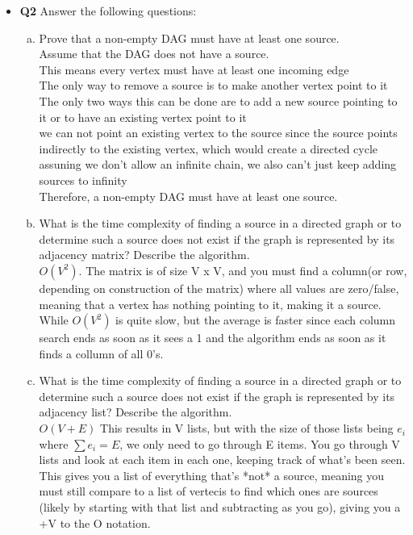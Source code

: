 \documentclass[11pt]{article}
\begin{document}
\begin{itemize}
\item \textbf{Q2} 
Answer the following questions:
\begin{enumerate}[(a)]
\item Prove that a non-empty DAG must have at least one source.
\\Assume that the DAG does not have a source.
\\This means every vertex must have at least one incoming edge
\\The only way to remove a source is to make another vertex point to it
\\The only two ways this can be done are to add a new source pointing to it or to have an existing vertex point to it
\\we can not point an existing vertex to the source since the source points indirectly to the existing vertex, which would create a directed cycle
\\assuning we don't allow an infinite chain, we also can't just keep adding sources to infinity
\\Therefore, a non-empty DAG must have at least one source.
\item What is the time complexity of finding a source in a directed graph or to determine such a source does not exist if the graph is represented by its adjacency matrix? Describe the algorithm.
\\$O(V^2)$. The matrix is of size V x V, and you must find a column(or row, depending on construction of the matrix) where all values are zero/false, meaning that a vertex has nothing pointing to it, making it a source. While $O(V^2)$ is quite slow, but the average is faster since each column search ends as soon as it sees a 1 and the algorithm ends as soon as it finds a collumn of all 0's.
\item What is the time complexity of finding a source in a directed graph or to determine such a source does not exist if the graph is represented by its adjacency list? Describe the algorithm.
\\$O(V+E)$ This results in V lists, but with the size of those lists being $e_i$ where $\sum e_i = E$, we only need to go through E items. You go through V lists and look at each item in each one, keeping track of what's been seen. This gives you a list of everything that's *not* a source, meaning you must still compare to a list of vertecis to find which ones are sources (likely by starting with that list and subtracting as you go), giving you a +V to the O notation.
\end{enumerate}
\vspace{0.1in}


\end{itemize}
\end{document}
